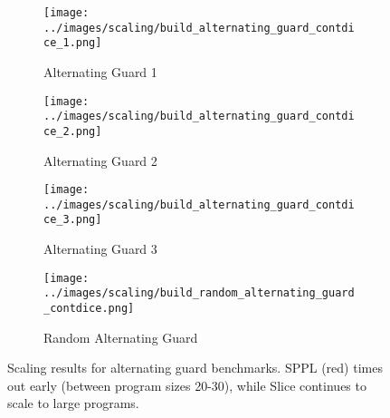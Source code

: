 \begin{figure}[!t]
\centering
\begin{subfigure}{0.48\textwidth}
\texttt{[image: ../images/scaling/build\_alternating\_guard\_contdice\_1.png]}
\caption{Alternating Guard 1}
\label{fig:alt-benchmarks-a}
\end{subfigure}
\hfill
\begin{subfigure}{0.48\textwidth}
\texttt{[image: ../images/scaling/build\_alternating\_guard\_contdice\_2.png]}
\caption{Alternating Guard 2}
\label{fig:alt-benchmarks-b}
\end{subfigure}
\vspace{0.5em}
\begin{subfigure}{0.48\textwidth}
\texttt{[image: ../images/scaling/build\_alternating\_guard\_contdice\_3.png]}
\caption{Alternating Guard 3}
\label{fig:alt-benchmarks-c}
\end{subfigure}
\hfill
\begin{subfigure}{0.48\textwidth}
\texttt{[image: ../images/scaling/build\_random\_alternating\_guard\_contdice.png]}
\caption{Random Alternating Guard}
\label{fig:alt-benchmarks-d}
\end{subfigure}
\caption{Scaling results for alternating guard benchmarks. SPPL (red) times out early (between program sizes 20-30), while Slice continues to scale to large programs.}
\label{fig:alt-benchmarks}
\end{figure}